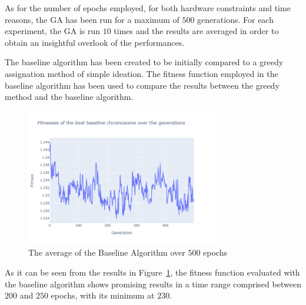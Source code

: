 As for the number of epochs employed, for both hardware constraints and time reasons, the GA has been run for a maximum of $500$ generations.
For each experiment, the GA is run $10$ times and the results are averaged in order to obtain an insightful overlook of the performances.

The baseline algorithm has been created to be initially compared to a greedy assignation method of simple ideation.
The fitness function employed in the baseline algorithm has been used to compare the results between the greedy method and the baseline algorithm.



\begin{figure}[ht]
    \centering
    \includegraphics[width=0.75\textwidth]{../../../Code/Genetic/results/baseline/graphs/pop_size_200/500_epochs/average_fitness.png}
    \caption{The average of the Baseline Algorithm over $500$ epochs}
    \label{fig:average_baseline}
\end{figure}






As it can be seen from the results in Figure~\ref{fig:average_baseline}, the fitness function evaluated with the baseline algorithm shows promising results
in a time range comprised between $200$ and $250$ epochs, with its minimum at $230$.

